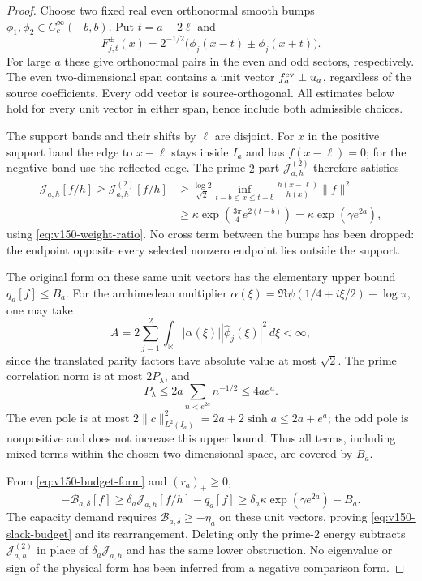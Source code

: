 \documentclass[11pt]{article}
\theoremstyle{remark}
\begin{document}
\begin{proof}
Choose two fixed real even orthonormal smooth bumps
$\phi_1,\phi_2\in C_c^\infty(-b,b)$. Put $t=a-2\ell$ and
\[
 F_{j,t}^{\pm}(x)=2^{-1/2}\bigl(\phi_j(x-t)\pm\phi_j(x+t)\bigr).
\]
For large $a$ these give orthonormal pairs in the even and odd sectors,
respectively. The even two-dimensional span contains a unit vector
$f_a^{\rm ev}\perp u_a$, regardless of the source coefficients. Every
odd vector is source-orthogonal. All estimates below hold for every
unit vector in either span, hence include both admissible choices.

The support bands and their shifts by $\ell$ are disjoint. For $x$ in
the positive support band the edge to $x-\ell$ stays inside $I_a$ and
has $f(x-\ell)=0$; for the negative band use the reflected edge. The
prime-$2$ part $\mathcal J^{(2)}_{a,h}$ therefore satisfies
\begin{align*}
 \mathcal J_{a,h}[f/h]\ge\mathcal J^{(2)}_{a,h}[f/h]
 &\ge\frac{\log2}{\sqrt2}
       \inf_{t-b\le x\le t+b}\frac{h(x-\ell)}{h(x)}\|f\|^2\\
 &\ge\kappa\exp\!\left(\frac{3\pi}{4}e^{2(t-b)}\right)
 =\kappa\exp(\gamma e^{2a}),
\end{align*}
using \eqref{eq:v150-weight-ratio}. No cross term between the bumps
has been dropped: the endpoint opposite every selected nonzero endpoint
lies outside the support.

The original form on these same unit vectors has the elementary upper
bound $q_a[f]\le B_a$. For the archimedean multiplier
$\alpha(\xi)=\Re\psi(1/4+i\xi/2)-\log\pi$, one may take
\[
 A=2\sum_{j=1}^2\int_{\mathbb R}|\alpha(\xi)|
                      |\widehat\phi_j(\xi)|^2\,d\xi<\infty,
\]
since the translated parity factors have absolute value at most
$\sqrt2$. The prime correlation norm is at most $2P_\lambda$, and
\[
 P_\lambda\le 2a\sum_{n<e^{2a}}n^{-1/2}\le4ae^a.
\]
The even pole is at most $2\|c\|_{L^2(I_a)}^2
=2a+2\sinh a\le2a+e^a$; the odd pole is nonpositive and does not
increase this upper bound. Thus all terms, including mixed terms within
the chosen two-dimensional space, are covered by $B_a$.

From \eqref{eq:v150-budget-form} and $(r_a)_+\ge0$,
\[
 -\mathcal B_{a,\delta}[f]\ge
       \delta_a\mathcal J_{a,h}[f/h]-q_a[f]
 \ge\delta_a\kappa\exp(\gamma e^{2a})-B_a.
\]
The capacity demand requires $\mathcal B_{a,\delta}\ge-\eta_a$ on
these unit vectors, proving \eqref{eq:v150-slack-budget} and its
rearrangement. Deleting only the prime-$2$ energy subtracts
$\mathcal J^{(2)}_{a,h}$ in place of $\delta_a\mathcal J_{a,h}$ and
has the same lower obstruction. No eigenvalue or sign of the physical
form has been inferred from a negative comparison form.
\end{proof}
\end{document}
